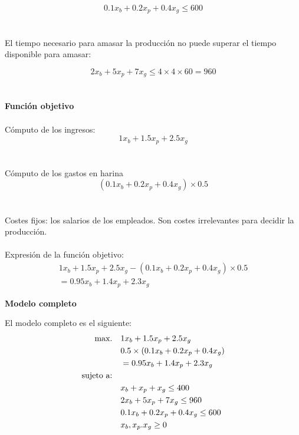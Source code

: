 \begin{equation}
    0.1x_b + 0.2x_p + 0.4x_g \leq 600
\end{equation}
\\
\\
El tiempo necesario para amasar la producción no puede superar el tiempo disponible para amasar:


\begin{equation}
    2x_b + 5x_p + 7x_g \leq 4\times4\times 60 = 960
\end{equation}
\\
\\
\textbf{Función objetivo}
\\
\\
Cómputo de los ingresos:
\begin{equation}
1x_b + 1.5x_p + 2.5x_g
\end{equation}
\\
\\
Cómputo de los gastos en harina
\begin{equation}
(0.1x_b + 0.2x_p + 0.4x_g)\times0.5
\end{equation}
\\
\\
Costes fijos: los salarios de los empleados. Son costes irrelevantes para decidir la producción.
\\
\\
Expresión de la función objetivo:
\begin{equation}
\begin{split}
1x_b + 1.5x_p + 2.5x_g - (0.1x_b + 0.2x_p + 0.4x_g)\times0.5 \\
= 0.95x_b + 1.4x_p + 2.3x_g 
\end{split}
\end{equation}

\textbf{Modelo completo}

El modelo completo es el siguiente:
\begin{align}
\mbox{max.} \quad & 1x_b + 1.5x_p + 2.5x_g \notag \\
\quad & 0.5 \times (0.1x_b + 0.2x_p + 0.4x_g) \notag \\
 \quad & = 0.95x_b + 1.4x_p + 2.3x_g \notag \\
\mbox{sujeto a:} \quad &  \notag \\		
             & x_b + x_p + x_g \leq 400 \notag \\
             & 2x_b + 5x_p + 7x_g \leq 960\notag  \\
             &  0.1x_b + 0.2x_p + 0.4x_g \leq 600\notag \\
             & x_b, x_p. x_g \geq 0
\end{align}    

